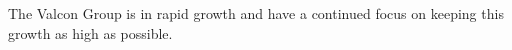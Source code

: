 The Valcon Group is in rapid growth and have a continued focus on keeping this growth as high as possible.